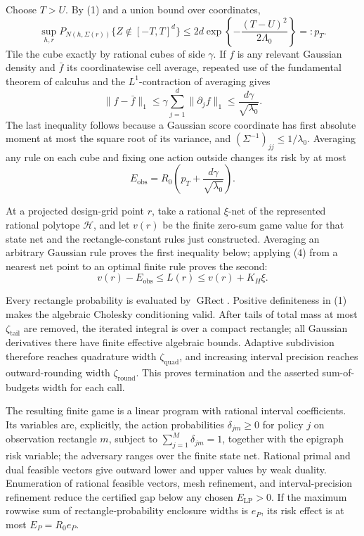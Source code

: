 Choose \(T>U\).  By (1) and a union bound over coordinates,
\[
 \sup_{h,r}P_{N(h,\Sigma(r))}\{Z\notin[-T,T]^d\}
 \leq2d\exp\left\{-\frac{(T-U)^2}{2\Lambda_0}\right\}=:p_T.       \tag{6}
\]
Tile the cube exactly by rational cubes of side \(\gamma\).  If \(f\) is any relevant Gaussian density and \(\bar f\) its coordinatewise cell average, repeated use of the fundamental theorem of calculus and the \(L^1\)-contraction of averaging gives
\[
 \lVert f-\bar f\rVert_1
 \leq\gamma\sum_{j=1}^d\lVert\partial_jf\rVert_1
 \leq\frac{d\gamma}{\sqrt{\lambda_0}}.                             \tag{7}
\]
The last inequality follows because a Gaussian score coordinate has first absolute moment at most the square root of its variance, and \((\Sigma^{-1})_{jj}\leq1/\lambda_0\).  Averaging any rule on each cube and fixing one action outside changes its risk by at most
\[
 E_{\mathrm{obs}}=R_0\left(p_T+\frac{d\gamma}{\sqrt{\lambda_0}}\right). \tag{8}
\]

At a projected design-grid point \(r\), take a rational \(\xi\)-net of the represented rational polytope \(\mathcal H\), and let \(v(r)\) be the finite zero-sum game value for that state net and the rectangle-constant rules just constructed.  Averaging an arbitrary Gaussian rule proves the first inequality below; applying (4) from a nearest net point to an optimal finite rule proves the second:
\[
 v(r)-E_{\mathrm{obs}}\leq L(r)\leq v(r)+K_H\xi.                    \tag{9}
\]

Every rectangle probability is evaluated by \(\operatorname{GRect}\).  Positive definiteness in (1) makes the algebraic Cholesky conditioning valid.  After tails of total mass at most \(\zeta_{\mathrm{tail}}\) are removed, the iterated integral is over a compact rectangle; all Gaussian derivatives there have finite effective algebraic bounds.  Adaptive subdivision therefore reaches quadrature width \(\zeta_{\mathrm{quad}}\), and increasing interval precision reaches outward-rounding width \(\zeta_{\mathrm{round}}\).  This proves termination and the asserted sum-of-budgets width for each call.

The resulting finite game is a linear program with rational interval coefficients.  Its variables are, explicitly, the action probabilities \(\delta_{jm}\geq0\) for policy \(j\) on observation rectangle \(m\), subject to \(\sum_{j=1}^M\delta_{jm}=1\), together with the epigraph risk variable; the adversary ranges over the finite state net.  Rational primal and dual feasible vectors give outward lower and upper values by weak duality.  Enumeration of rational feasible vectors, mesh refinement, and interval-precision refinement reduce the certified gap below any chosen \(E_{\mathrm{LP}}>0\).  If the maximum rowwise sum of rectangle-probability enclosure widths is \(e_P\), its risk effect is at most \(E_P=R_0e_P\).

